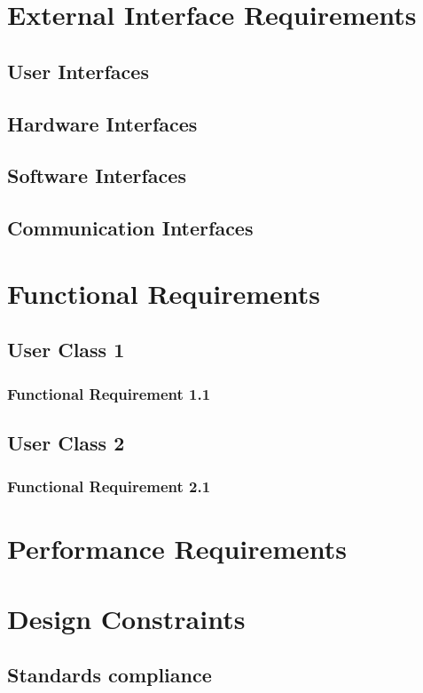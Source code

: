 \documentclass[a4paper,12pt]{book}
\begin{document}
\section{External Interface Requirements}
\subsection{User Interfaces}
\subsection{Hardware Interfaces}
\subsection{Software  Interfaces}
\subsection{Communication Interfaces}

\newpage
\section{Functional Requirements}
\subsection{User Class 1}
\subsubsection{Functional Requirement 1.1}
\subsection{User Class 2}
\subsubsection{Functional Requirement 2.1}

\newpage
\section{Performance Requirements}

\newpage
\section{Design Constraints}
\subsection{Standards compliance}
\end{document}
